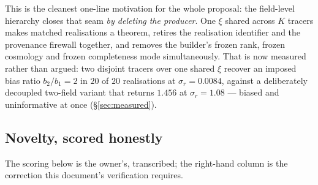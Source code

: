 \documentclass[11pt]{article}
\theoremstyle{definition}
\theoremstyle{remark}
\begin{document}
\noindent This is the cleanest one-line motivation for the whole proposal: the
field-level hierarchy closes that seam \emph{by deleting the producer}. One $\xi$
shared across $K$ tracers makes matched realisations a theorem, retires the
realisation identifier and the provenance firewall together, and removes the
builder's frozen rank, frozen cosmology and frozen completeness mode
simultaneously. That is now measured rather than argued: two disjoint tracers
over one shared $\xi$ recover an imposed bias ratio $b_2/b_1=2$ in $20$ of $20$
realisations at $\sigma_r=0.0084$, against a deliberately decoupled two-field
variant that returns $1.456$ at $\sigma_r=1.08$ --- biased and uninformative at
once (\S\ref{sec:measured}).

\subsection{Novelty, scored honestly}

The scoring below is the owner's, transcribed; the right-hand column is the
correction this document's verification requires.
\end{document}
